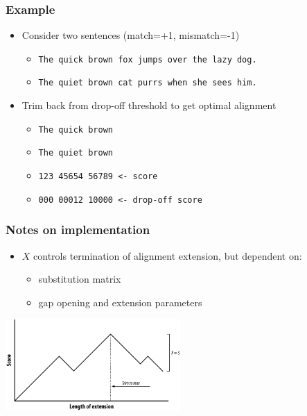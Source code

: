 \documentclass[table]{beamer}
\begin{document}
  \begin{frame}
    \frametitle{Example}
    \begin{itemize}
      \item Consider two sentences (match=+1, mismatch=-1)
      \begin{itemize}
        \item \texttt{The quick brown fox jumps over the lazy dog.}
        \item \texttt{The quiet brown cat purrs when she sees him.}
      \end{itemize}
      \item Trim back from drop-off threshold to get optimal alignment
      \begin{itemize}
        \item \texttt{The quick brown}
        \item \texttt{The quiet brown}
        \item \texttt{123 45654 56789 <- score}
        \item \texttt{000 00012 10000 <- drop-off score}        
      \end{itemize}
    \end{itemize}
  \end{frame}

  \begin{frame}
    \frametitle{Notes on implementation}
    \begin{itemize}
      \item $X$ controls termination of alignment extension, but dependent on:
      \begin{itemize}
        \item substitution matrix
        \item gap opening and extension parameters
      \end{itemize}
    \end{itemize}
    \begin{center}
      \includegraphics[width=0.5\textwidth]{images/extension} 
    \end{center}    
  \end{frame}
\end{document}

